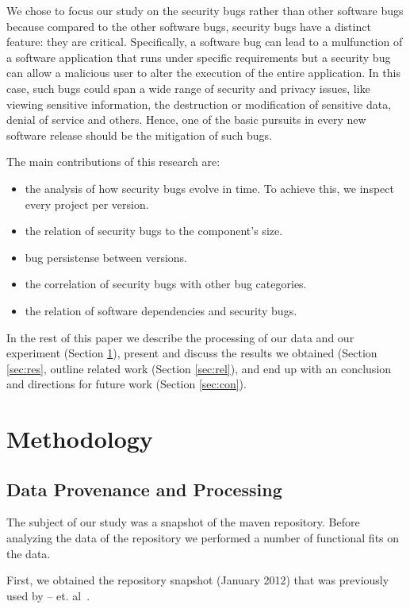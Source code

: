 \documentclass[conference]{IEEEtran}
\begin{document}
We chose to focus our study on the security bugs rather than other
software bugs because compared to the other software bugs,
security bugs have a distinct feature: they are critical. Specifically, a software bug can
lead to a mulfunction of a software application that runs under specific
requirements but a security bug can allow a malicious user to alter the
execution of the entire application. In this case, such bugs could span a wide range
of security and privacy issues, like viewing sensitive information, the destruction or
modification of sensitive data, denial of service and others.
Hence, one of the basic pursuits in every new software release should be the
mitigation of such bugs.

The main contributions of this research are:

\begin{itemize}
	\item the analysis of how security bugs evolve in time. To achieve
this, we inspect every project per version.
	\item the relation of security bugs to the component's size.
	\item bug persistense between versions.
	\item the correlation of security bugs with other bug categories.
	\item the relation of software dependencies and security bugs.
\end{itemize}

In the rest of this paper we
describe the processing of our data and our experiment (Section \ref{sec:meth}),
present and discuss the results we obtained (Section \ref{sec:res},
outline related work (Section \ref{sec:rel}),
and end up with an conclusion and directions for future work (Section \ref{sec:con}).

\section{Methodology}
\label{sec:meth}

\subsection{Data Provenance and Processing}
\label{sec:data}

The subject of our study was a snapshot of the maven repository. Before
analyzing the data of the repository we performed a number of functional fits
on the data.

First, we obtained the repository snapshot (January 2012) that was previously
used by -- et. al~\cite{}.
\end{document}
